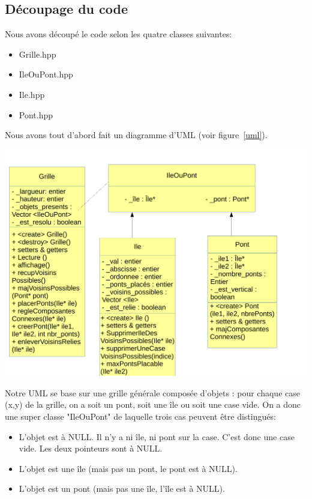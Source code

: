 \documentclass[french]{article}
\begin{document}
    \subsection{\Large Découpage du code}
    \hspace{0.5cm} Nous avons découpé le code selon les quatre classes suivantes:
        \begin{itemize}
        \item Grille.hpp
        \item IleOuPont.hpp
        \item Ile.hpp
        \item Pont.hpp
        
        \end{itemize}
    Nous avons tout d'abord fait un diagramme d'UML (voir figure~\ref{uml}). \\
    \centerline{\includegraphics[width=1.1 \textwidth]{UML.pdf}}
    \label{uml}
    \vspace{0.5cm}
 Notre UML se base sur une grille générale composée d'objets : pour chaque case (x,y) de la grille, on a soit un pont, soit une île ou soit une case vide. On a donc une super classe "IleOuPont" de laquelle trois cas peuvent être distingués:
 \begin{itemize}
     \item L'objet est à NULL. Il n'y a ni île, ni pont sur la case. C'est donc une case vide. Les deux pointeurs sont à NULL.
     \item L'objet est une île (mais pas un pont, le pont est à NULL).
     \item L'objet est un pont (mais pas une île, l'île est à NULL).
 \end{itemize}
\end{document}
